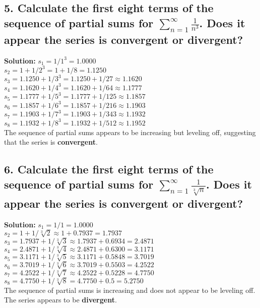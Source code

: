 \documentclass{article}
\begin{document}
\subsection*{5. Calculate the first eight terms of the sequence of partial sums for $\sum_{n=1}^{\infty} \frac{1}{n^3}$. Does it appear the series is convergent or divergent?}
\textbf{Solution:}
$s_1 = 1/1^3 = 1.0000$ \\
$s_2 = 1 + 1/2^3 = 1 + 1/8 = 1.1250$ \\
$s_3 = 1.1250 + 1/3^3 = 1.1250 + 1/27 \approx 1.1620$ \\
$s_4 = 1.1620 + 1/4^3 = 1.1620 + 1/64 \approx 1.1777$ \\
$s_5 = 1.1777 + 1/5^3 = 1.1777 + 1/125 \approx 1.1857$ \\
$s_6 = 1.1857 + 1/6^3 = 1.1857 + 1/216 \approx 1.1903$ \\
$s_7 = 1.1903 + 1/7^3 = 1.1903 + 1/343 \approx 1.1932$ \\
$s_8 = 1.1932 + 1/8^3 = 1.1932 + 1/512 \approx 1.1952$ \\
The sequence of partial sums appears to be increasing but leveling off, suggesting that the series is \textbf{convergent}.

\subsection*{6. Calculate the first eight terms of the sequence of partial sums for $\sum_{n=1}^{\infty} \frac{1}{\sqrt[3]{n}}$. Does it appear the series is convergent or divergent?}
\textbf{Solution:}
$s_1 = 1/1 = 1.0000$ \\
$s_2 = 1 + 1/\sqrt[3]{2} \approx 1 + 0.7937 = 1.7937$ \\
$s_3 = 1.7937 + 1/\sqrt[3]{3} \approx 1.7937 + 0.6934 = 2.4871$ \\
$s_4 = 2.4871 + 1/\sqrt[3]{4} \approx 2.4871 + 0.6300 = 3.1171$ \\
$s_5 = 3.1171 + 1/\sqrt[3]{5} \approx 3.1171 + 0.5848 = 3.7019$ \\
$s_6 = 3.7019 + 1/\sqrt[3]{6} \approx 3.7019 + 0.5503 = 4.2522$ \\
$s_7 = 4.2522 + 1/\sqrt[3]{7} \approx 4.2522 + 0.5228 = 4.7750$ \\
$s_8 = 4.7750 + 1/\sqrt[3]{8} = 4.7750 + 0.5 = 5.2750$ \\
The sequence of partial sums is increasing and does not appear to be leveling off. The series appears to be \textbf{divergent}.
\end{document}
